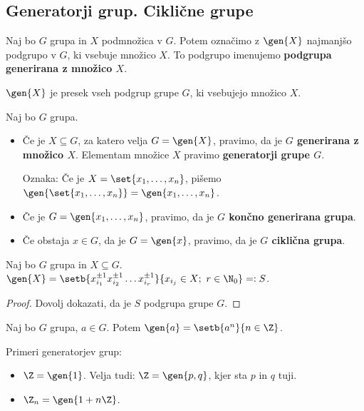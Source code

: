 \subsection{Generatorji grup. Ciklične grupe}

\begin{definicija}
    Naj bo $G$ grupa in $X$ podmnožica v $G$. Potem označimo z $\gen{X}$ najmanjšo podgrupo v $G$, ki vsebuje množico $X$. To podgrupo imenujemo \textbf{podgrupa generirana z množico $X$}.
\end{definicija}

\begin{opomba}
    $\gen{X}$ je presek vseh podgrup grupe $G$, ki vsebujejo množico $X$.
\end{opomba}

\begin{definicija}
    Naj bo $G$ grupa. 
    
    \begin{itemize}
        \item Če je $X \subseteq G$, za katero velja $G = \gen{X}$, pravimo, da je \textbf{$G$ generirana z množico $X$}. Elementam množice $X$ pravimo \textbf{generatorji grupe $G$}.
        
        Oznaka: Če je $X = \set{x_1, \ldots, x_n}$, pišemo $\gen{\set{x_1, \ldots, x_n}} = \gen{x_1, \ldots, x_n}$.
        \item Če je $G = \gen{x_1, \ldots, x_n}$, pravimo, da je \textbf{$G$ končno generirana grupa}.
        \item Če obstaja $x \in G$, da je $G = \gen{x}$, pravimo, da je \textbf{$G$ ciklična grupa}.
    \end{itemize}    
\end{definicija}

\begin{trditev}
    Naj bo $G$ grupa in $X \subseteq G$. $\gen{X} = \setb{x_{i_1}^{\pm 1} x_{i_2}^{\pm 1} \ldots x_{i_r}^{\pm 1}}{x_{i_j} \in X; \ r \in \N_0} =: S$.
\end{trditev}

\begin{proof}
    Dovolj dokazati, da je $S$ podgrupa grupe $G$.
\end{proof}

\begin{posledica}
    Naj bo $G$ grupa, $a \in G$. Potem $\gen{a} = \setb{a^n}{n \in \Z}$.
\end{posledica}

\begin{primer}
    Primeri generatorjev grup:
    \begin{itemize}
        \item $\Z = \gen{1}$. Velja tudi: $\Z = \gen{p, q}$, kjer sta $p$ in $q$ tuji.
        \item $\Z_n = \gen{1 + n\Z}$.
    \end{itemize}
\end{primer}

